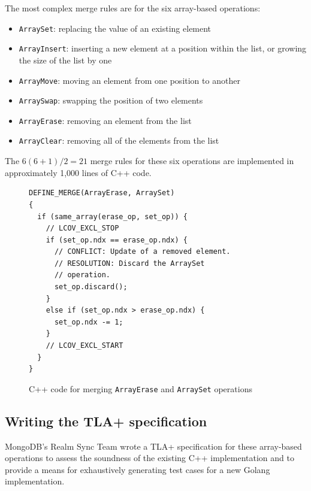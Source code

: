 \documentclass{vldb}
\begin{document}
The most complex merge rules are for the six array-based operations:

\begin{itemize}[itemsep=-0.5ex]
  \item \texttt{ArraySet}: replacing the value of an existing element
  \item \texttt{ArrayInsert}: inserting a new element at a position within the list, or growing the size of the list by one
  \item \texttt{ArrayMove}: moving an element from one position to another
  \item \texttt{ArraySwap}: swapping the position of two elements
  \item \texttt{ArrayErase}: removing an element from the list
  \item \texttt{ArrayClear}: removing all of the elements from the list
\end{itemize}

The $6 (6 + 1) / 2 = 21$ merge rules for these six operations are implemented in approximately 1,000 lines of C++ code.

\begin{figure}
\begin{verbatim}
DEFINE_MERGE(ArrayErase, ArraySet)
{
  if (same_array(erase_op, set_op)) {
    // LCOV_EXCL_STOP
    if (set_op.ndx == erase_op.ndx) {
      // CONFLICT: Update of a removed element.
      // RESOLUTION: Discard the ArraySet
      // operation.
      set_op.discard();
    }
    else if (set_op.ndx > erase_op.ndx) {
      set_op.ndx -= 1;
    }
    // LCOV_EXCL_START
  }
}
\end{verbatim}
\caption{C++ code for merging \texttt{ArrayErase} and \texttt{ArraySet} operations}
\label{fig:cpp_erase_set_merge}
\end{figure}

\subsection{Writing the TLA+ specification}
\label{subsec:mbtcg_tlaplus}

MongoDB's Realm Sync Team wrote a TLA+ specification for these array-based operations to assess the soundness of the existing C++ implementation and to provide a means for exhaustively generating test cases for a new Golang implementation.

\end{document}
